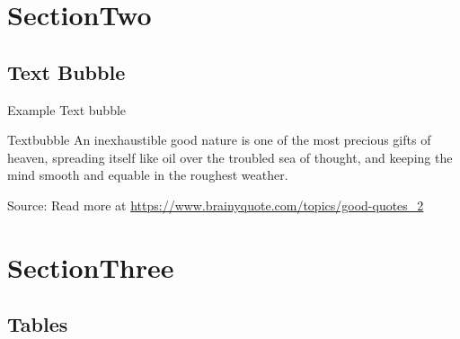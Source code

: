 \documentclass[aspectratio=169, serif ]{beamer}
\begin{document}
\section{SectionTwo}
\subsection{Text Bubble}
\begin{frame}{Example Text bubble}
       
    \begin{block}{Textbubble}
        \fontsize{7}{10}\selectfont
        An inexhaustible good nature is one of the most precious gifts of heaven, spreading itself like oil over the troubled sea of thought, and keeping the mind smooth and equable in the roughest weather. \newline
        
        Source: Read more at  \url{https://www.brainyquote.com/topics/good-quotes_2}
                    
    \end{block}
    
\end{frame}

\section{SectionThree}
\subsection{Tables}
\end{document}
